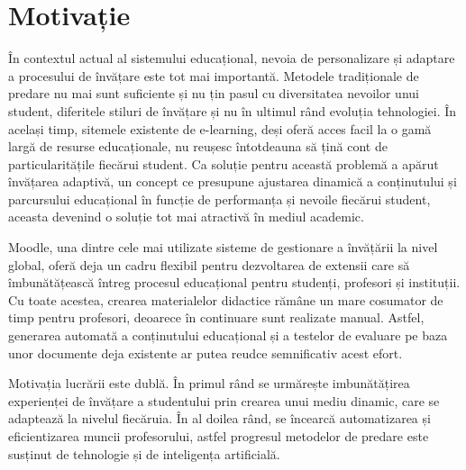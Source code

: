 \chapter*{Motivație} 

În contextul actual al sistemului educațional, nevoia de personalizare și adaptare a procesului de învățare este tot mai importantă. Metodele tradiționale de predare nu mai sunt suficiente 
și nu țin pasul cu diversitatea nevoilor unui student, diferitele stiluri de învățare și nu în ultimul rând evoluția tehnologiei. În același timp, sitemele existente de e-learning, deși oferă
acces facil la o gamă largă de resurse educaționale, nu reușesc întotdeauna să țină cont de particularitățile fiecărui student. Ca soluție pentru această problemă a apărut învățarea adaptivă,
un concept ce presupune ajustarea dinamică a conținutului și parcursului educațional în funcție de performanța și nevoile fiecărui student, aceasta devenind o soluție tot mai atractivă în 
mediul academic.

Moodle, una dintre cele mai utilizate sisteme de gestionare a învățării la nivel global, oferă deja un cadru flexibil pentru dezvoltarea de extensii care să îmbunătățească întreg procesul educațional
pentru studenți, profesori și instituții. Cu toate acestea, crearea materialelor didactice rămâne un mare cosumator de timp pentru profesori, deoarece în continuare sunt realizate manual.
Astfel, generarea automată a conținutului educațional și a testelor de evaluare pe baza unor documente deja existente ar putea reudce semnificativ acest efort.

Motivația lucrării este dublă. În primul rând se urmărește imbunătățirea experienței de învățare a studentului prin crearea unui mediu dinamic, care se adaptează la nivelul fiecăruia. În 
al doilea rând, se încearcă automatizarea și eficientizarea muncii profesorului, astfel progresul metodelor de predare este susținut de tehnologie și de inteligența artificială.

